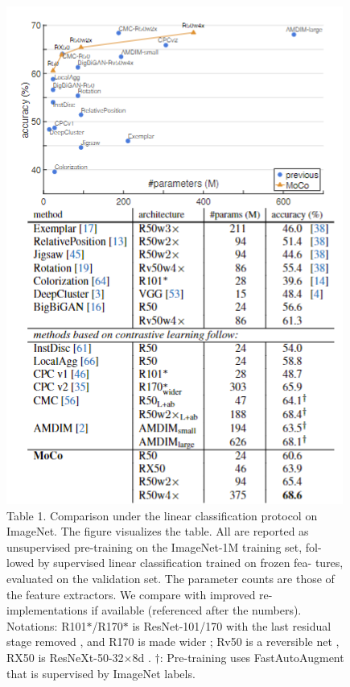 \documentclass[10pt,twocolumn]{article}  %
\begin{document}
\begin{figure}[t!]
    \centering
    \includegraphics[width=1\linewidth]{Pic/table1.png} %
    \captionsetup{labelformat=empty}
    \caption{Table 1. Comparison under the linear classiﬁcation protocol
    on ImageNet. The ﬁgure visualizes the table. All are reported as
    unsupervised pre-training on the ImageNet-1M training set, fol-
    lowed by supervised linear classiﬁcation trained on frozen fea-
    tures, evaluated on the validation set. The parameter counts are
    those of the feature extractors. We compare with improved re-
    implementations if available (referenced after the numbers).
    Notations: R101$\ast $/R170$\ast $ is ResNet-101/170 with the last residual stage
    removed \cite{14_doersch2017multi, 46_oord2018representation, 35_henaff2019data},
    and R170 is made wider \cite{35_henaff2019data}; Rv50 is a reversible
    net \cite{23_gomez2017reversible}, RX50 is ResNeXt-50-32$\times $8d \cite{62_xie2017residual}.
    $\dagger$: Pre-training uses FastAutoAugment \cite{40_lim2019fast} that is supervised by ImageNet labels.} %
    \label{fig:Table 1} %
    \vspace{-1em}
\end{figure}
\end{document}
